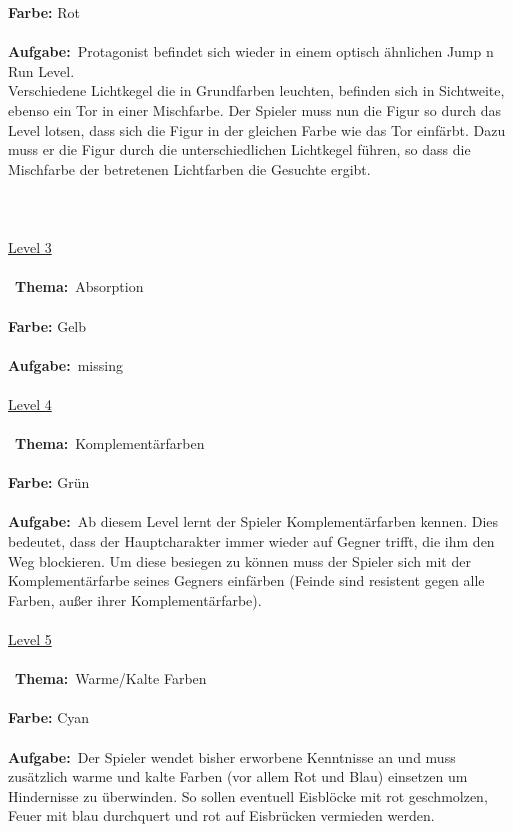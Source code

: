 \documentclass[10pt,a4paper,notitlepage]{report}
\begin{document}
	\textbf{Farbe:} Rot\
	\\\\
	\textbf{Aufgabe:}\	
	Protagonist befindet sich wieder in einem optisch ähnlichen Jump n Run Level.\\
	Verschiedene Lichtkegel die in Grundfarben leuchten, befinden sich in Sichtweite, ebenso ein Tor in einer Mischfarbe.
	 Der Spieler muss nun die Figur so durch das Level lotsen, dass sich die Figur in der gleichen Farbe wie das Tor einfärbt. 
	Dazu muss er die Figur durch die unterschiedlichen Lichtkegel führen, so dass die Mischfarbe der betretenen Lichtfarben die Gesuchte ergibt.\\
	\\\\
	\clearpage\
	\marginpar{\vspace{3.0mm} \color{orange}\rule{0.8mm}{53.3mm} \\[3mm] \color{hellorange}\rule{0.8mm}{170mm}}
	\\
	\underline{Level 3}\\\\\
	\textbf{Thema:}\
	Absorption
	\\\\
	\textbf{Farbe:} Gelb\
	\\\\
	\textbf{Aufgabe:}\
	missing
	\\\\
	\underline{Level 4}\\\\\
	\textbf{Thema:}\
	Komplementärfarben
	\\\\
	\textbf{Farbe:} Grün\
	\\\\
	\textbf{Aufgabe:}\
	Ab diesem Level lernt der Spieler Komplementärfarben kennen. Dies bedeutet, dass der Hauptcharakter immer wieder auf Gegner trifft, die ihm den Weg blockieren. Um diese besiegen zu können muss der Spieler sich mit der Komplementärfarbe seines Gegners einfärben (Feinde sind resistent gegen alle Farben, außer ihrer Komplementärfarbe). 
	\\\\
	\underline{Level 5}\\\\\
	\textbf{Thema:}\
	Warme/Kalte Farben
	\\\\
	\textbf{Farbe:} Cyan\
	\\\\
	\textbf{Aufgabe:}\
	Der Spieler wendet bisher erworbene Kenntnisse an und muss zusätzlich warme und kalte Farben (vor allem Rot und Blau) einsetzen um Hindernisse zu 			überwinden. So sollen eventuell Eisblöcke mit rot geschmolzen, Feuer mit blau durchquert und rot auf Eisbrücken vermieden werden.
\end{document}
